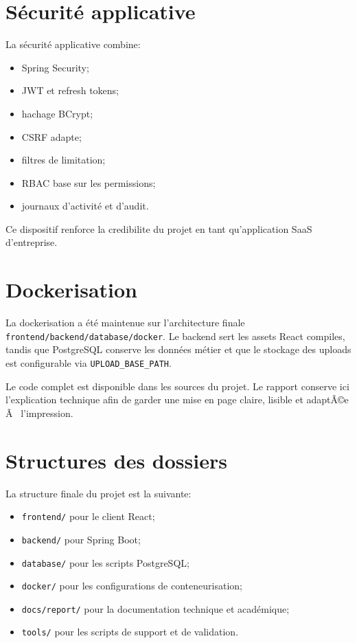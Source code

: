 ﻿\documentclass[12pt,a4paper,oneside]{report}
\newenvironment{codeblock}[1][]{
  \par
  \captionsetup{type=figure}
}{
  \par
}
\begin{document}
\section{Sécurité applicative}
La sécurité applicative combine:
\begin{itemize}
  \item Spring Security;
  \item JWT et refresh tokens;
  \item hachage BCrypt;
  \item CSRF adapte;
  \item filtres de limitation;
  \item RBAC base sur les permissions;
  \item journaux d'activité et d'audit.
\end{itemize}

Ce dispositif renforce la credibilite du projet en tant qu'application SaaS d'entreprise.

\section{Dockerisation}
La dockerisation a été maintenue sur l'architecture finale \texttt{frontend/back\-end/database/docker}. Le backend sert les assets React compiles, tandis que PostgreSQL conserve les données métier et que le stockage des uploads est configurable via \texttt{UPLOAD\_BASE\_PATH}.

\begin{codeblock}[H]
\caption{Dockerfile de l'application Spring Boot}
\begin{keybox}
Le code complet est disponible dans les sources du projet. Le rapport conserve ici l'explication technique afin de garder une mise en page claire, lisible et adaptÃ©e Ã  l'impression.
\end{keybox}
\end{codeblock}

\section{Structures des dossiers}
La structure finale du projet est la suivante:
\begin{itemize}
  \item \texttt{frontend/} pour le client React;
  \item \texttt{backend/} pour Spring Boot;
  \item \texttt{database/} pour les scripts PostgreSQL;
  \item \texttt{docker/} pour les configurations de conteneurisation;
  \item \texttt{docs/report/} pour la documentation technique et académique;
  \item \texttt{tools/} pour les scripts de support et de validation.
\end{itemize}
\end{document}
